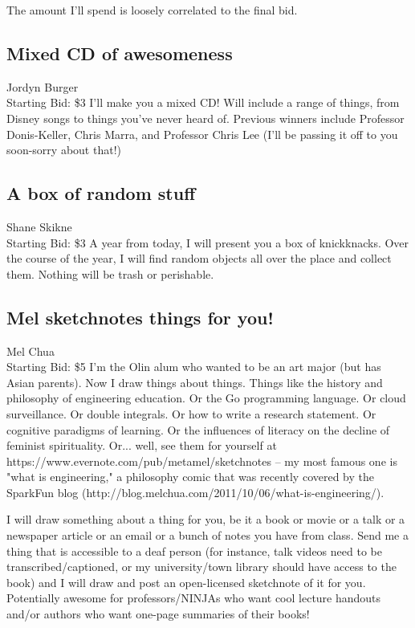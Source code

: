 \documentclass[11pt]{article}
\begin{document}
The amount I'll spend is loosely correlated to the final bid.
\subsection{Mixed CD of awesomeness}
Jordyn Burger
\\
Starting Bid: \$3
\newline
I'll make you a mixed CD! Will include a range of things, from Disney songs to things you've never heard of. Previous winners include Professor Donis-Keller, Chris Marra, and Professor Chris Lee (I'll be passing it off to you soon-sorry about that!)
\subsection{A box of random stuff}
Shane Skikne
\\
Starting Bid: \$3
\newline
A year from today, I will present you a box of knickknacks. Over the course of the year, I will find random objects all over the place and collect them. Nothing will be trash or perishable.
\subsection{Mel sketchnotes things for you!}
Mel Chua
\\
Starting Bid: \$5
\newline
I'm the Olin alum who wanted to be an art major (but has Asian parents). Now I draw things about things. Things like the history and philosophy of engineering education. Or the Go programming language. Or cloud surveillance. Or double integrals. Or how to write a research statement. Or cognitive paradigms of learning. Or the influences of literacy on the decline of feminist spirituality. Or... well, see them for yourself at https://www.evernote.com/pub/metamel/sketchnotes -- my most famous one is "what is engineering," a philosophy comic that was recently covered by the SparkFun blog (http://blog.melchua.com/2011/10/06/what-is-engineering/).

I will draw something about a thing for you, be it a book or movie or a talk or a newspaper article or an email or a bunch of notes you have from class. Send me a thing that is accessible to a deaf person (for instance, talk videos need to be transcribed/captioned, or my university/town library should have access to the book) and I will draw and post an open-licensed sketchnote of it for you. Potentially awesome for professors/NINJAs who want cool lecture handouts and/or authors who want one-page summaries of their books!
\end{document}

